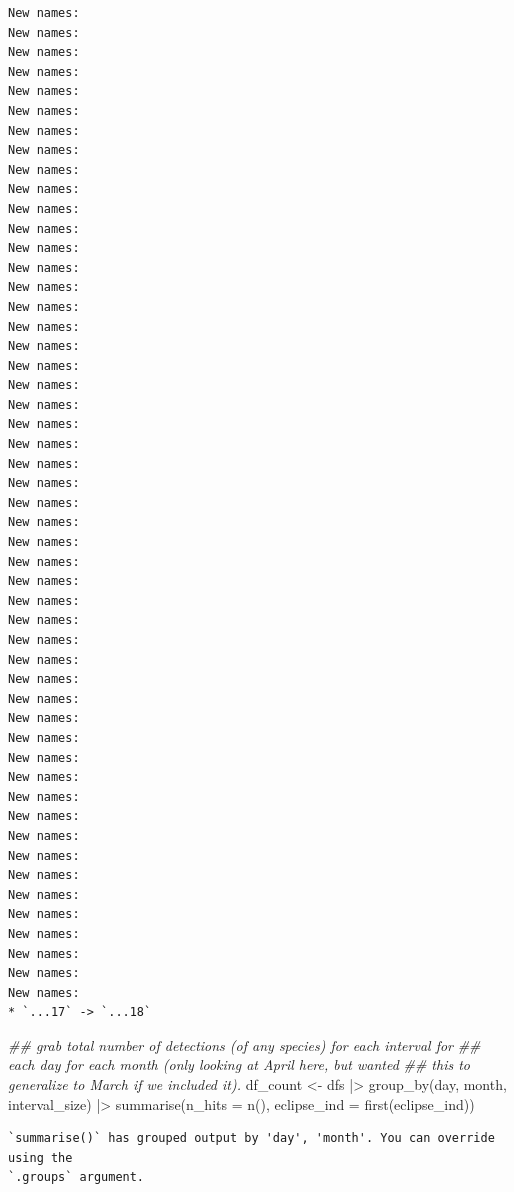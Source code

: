 \documentclass[
  letterpaper,
  DIV=11,
  numbers=noendperiod]{scrartcl}
\newenvironment{Shaded}{\begin{snugshade}}{\end{snugshade}}
\newcommand{\AttributeTok}[1]{\textcolor[rgb]{0.40,0.45,0.13}{#1}}
\newcommand{\DocumentationTok}[1]{\textcolor[rgb]{0.37,0.37,0.37}{\textit{#1}}}
\newcommand{\FunctionTok}[1]{\textcolor[rgb]{0.28,0.35,0.67}{#1}}
\newcommand{\NormalTok}[1]{\textcolor[rgb]{0.00,0.23,0.31}{#1}}
\newcommand{\OtherTok}[1]{\textcolor[rgb]{0.00,0.23,0.31}{#1}}
\newcommand{\SpecialCharTok}[1]{\textcolor[rgb]{0.37,0.37,0.37}{#1}}
\begin{document}
\begin{verbatim}
New names:
New names:
New names:
New names:
New names:
New names:
New names:
New names:
New names:
New names:
New names:
New names:
New names:
New names:
New names:
New names:
New names:
New names:
New names:
New names:
New names:
New names:
New names:
New names:
New names:
New names:
New names:
New names:
New names:
New names:
New names:
New names:
New names:
New names:
New names:
New names:
New names:
New names:
New names:
New names:
New names:
New names:
New names:
New names:
New names:
New names:
New names:
New names:
New names:
New names:
New names:
* `...17` -> `...18`
\end{verbatim}

\begin{Shaded}
\begin{Highlighting}[]
\DocumentationTok{\#\# grab total number of detections (of any species) for each interval for}
\DocumentationTok{\#\# each day for each month (only looking at April here, but wanted}
\DocumentationTok{\#\# this to generalize to March if we included it).}
\NormalTok{df\_count }\OtherTok{\textless{}{-}}\NormalTok{ dfs }\SpecialCharTok{|\textgreater{}} \FunctionTok{group\_by}\NormalTok{(day, month, interval\_size) }\SpecialCharTok{|\textgreater{}}
  \FunctionTok{summarise}\NormalTok{(}\AttributeTok{n\_hits =} \FunctionTok{n}\NormalTok{(),}
    \AttributeTok{eclipse\_ind =} \FunctionTok{first}\NormalTok{(eclipse\_ind))}
\end{Highlighting}
\end{Shaded}

\begin{verbatim}
`summarise()` has grouped output by 'day', 'month'. You can override using the
`.groups` argument.
\end{verbatim}
\end{document}
